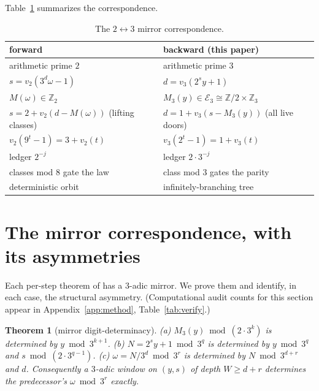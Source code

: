 \documentclass[11pt]{article}
\newtheorem{theorem}{Theorem}[section]
\theoremstyle{remark}
\newcommand{\Z}{\mathbb{Z}}
\newcommand{\vt}[1]{v_2\!\left(#1\right)}
\newcommand{\vth}[1]{v_3\!\left(#1\right)}
\newcommand{\w}{\omega}
\newcommand{\E}{\mathcal{E}_3}
\begin{document}
Table~\ref{tab:dual} summarizes the correspondence.

\begin{table}[h]\centering\small
\begin{tabular}{l|l}
forward \cite{paper1} & backward (this paper) \\\hline
arithmetic prime $2$ & arithmetic prime $3$ \\
$s = \vt{3^d\w - 1}$ & $d = \vth{2^s y + 1}$ \\
$M(\w) \in \Z_2$ & $M_3(y) \in \E \cong \Z/2\times\Z_3$ \\
$s = 2 + \vt{d - M(\w)}$ (lifting classes) & $d = 1 + \vth{s - M_3(y)}$ (all live doors) \\
$\vt{9^t - 1} = 3 + \vt t$ & $\vth{2^t - 1} = 1 + \vth t$ \\
ledger $2^{-j}$ & ledger $2\cdot3^{-j}$ \\
classes mod $8$ gate the law & class mod $3$ gates the parity \\
deterministic orbit & infinitely-branching tree \\
\end{tabular}
\caption{The $2\leftrightarrow3$ mirror correspondence.}\label{tab:dual}
\end{table}

\section{The mirror correspondence, with its asymmetries}\label{sec:dual}

Each per-step theorem of \cite[\S3]{paper1} has a $3$-adic mirror. We prove them and identify, in each case, the structural asymmetry. (Computational audit counts for this section appear in Appendix~\ref{app:method}, Table~\ref{tab:verify}.)

\begin{theorem}[mirror digit-determinacy]\label{thm:mdd}
(a) $M_3(y) \bmod (2\cdot 3^k)$ is determined by $y \bmod 3^{k+1}$. (b) $N = 2^s y + 1 \bmod 3^q$ is determined by $y \bmod 3^q$ and $s \bmod (2\cdot3^{q-1})$. (c) $\w = N/3^d \bmod 3^r$ is determined by $N \bmod 3^{d+r}$ and $d$. Consequently a $3$-adic window on $(y,s)$ of depth $W \ge d + r$ determines the predecessor's $\w \bmod 3^r$ exactly.
\end{theorem}
\end{document}
